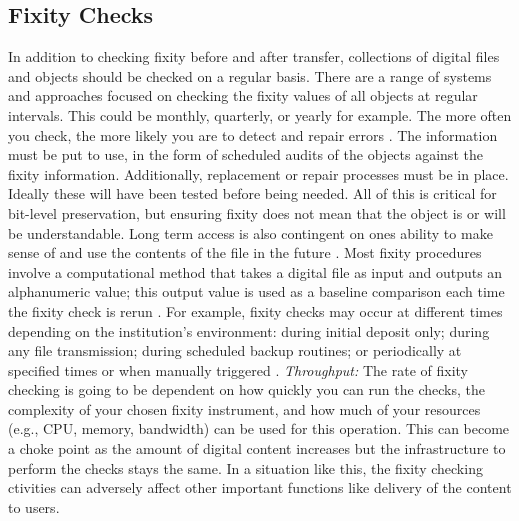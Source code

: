 \subsection{Fixity Checks}
In addition to checking fixity before and after transfer, collections of digital files and objects should be checked on a regular basis. There are a range of systems and approaches focused on checking the fixity values of all objects at regular intervals. This could be monthly, quarterly, or yearly for example. The more often you check, the more likely you are to detect and repair errors \cite[4]{ndsa2014fixity}.
The information must be put to use, in the form of scheduled audits of the objects against the fixity information. Additionally, replacement or repair processes must be in place. Ideally these will have been tested before being needed. All of this is critical for bit-level preservation, but ensuring fixity does not mean that the object is or will be understandable. Long term access is also contingent on ones ability to make sense of and use the contents of the file in the future \cite[2]{ndsa2014fixity}.
Most fixity procedures involve a computational method that takes a digital file as input and outputs an alphanumeric value; this output value is used as a baseline comparison each time the fixity check is rerun \cite[5]{ndsa2017fixity}. 
For example, fixity checks may occur at different times depending on the institution's environment: during initial deposit only; during any file transmission; during scheduled backup routines; or periodically at specified times or when manually triggered \cite[7]{ndsa2017fixity}.
\textit{Throughput:} The rate of fixity checking is going to be dependent on how quickly you can run the checks, the complexity of your chosen fixity instrument, and how much of your resources (e.g., CPU, memory, bandwidth) can be used for this operation. This can become a choke point as the amount of digital content increases but the infrastructure to perform the checks stays the same. In a situation like this, the fixity checking  ctivities can adversely affect other important functions like delivery of the content to users.
